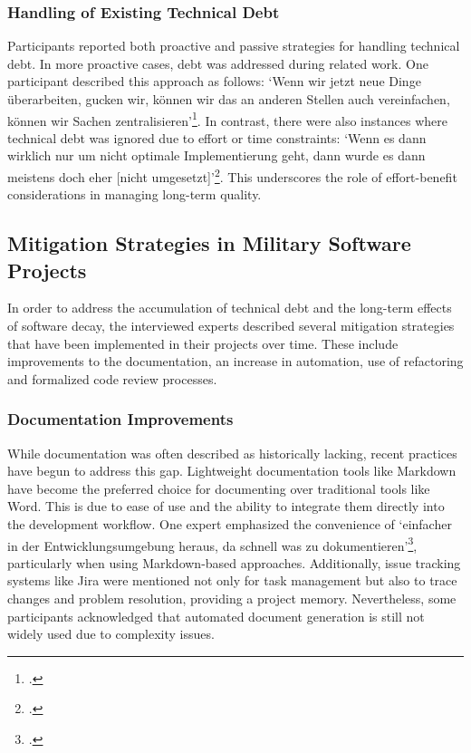 \subsubsection{Handling of Existing Technical Debt}
Participants reported both proactive and passive strategies for handling technical debt. In more proactive cases, debt was addressed during related work. One participant described this approach as follows: `Wenn wir jetzt neue Dinge überarbeiten, gucken wir, können wir das an anderen Stellen auch vereinfachen, können wir Sachen zentralisieren'\footcite[78]{Interview32025}.
In contrast, there were also instances where technical debt was ignored due to effort or time constraints: `Wenn es dann wirklich nur um nicht optimale Implementierung geht, dann wurde es dann meistens doch eher [nicht umgesetzt]'\footcite[70]{Interview22025}.
This underscores the role of effort-benefit considerations in managing long-term quality.

\subsection{Mitigation Strategies in Military Software Projects}
In order to address the accumulation of technical debt and the long-term effects of software decay, the interviewed experts described several mitigation strategies that have been implemented in their projects over time. These include improvements to the documentation, an increase in automation,
use of refactoring and formalized code review processes.

\subsubsection{Documentation Improvements}
While documentation was often described as historically lacking, recent practices have begun to address this gap. Lightweight documentation tools like Markdown have become the preferred choice for documenting over traditional tools like Word. This is due to ease of use and the ability to integrate 
them directly into the development workflow. One expert emphasized the convenience of `einfacher in der Entwicklungsumgebung heraus, da schnell was zu dokumentieren'\footcite[78]{Interview32025}, particularly when using Markdown-based approaches. Additionally, issue tracking systems like Jira were mentioned not only for task management
but also to trace changes and problem resolution, providing a project memory. Nevertheless, some participants acknowledged that automated document generation is still not widely used due to complexity issues.

